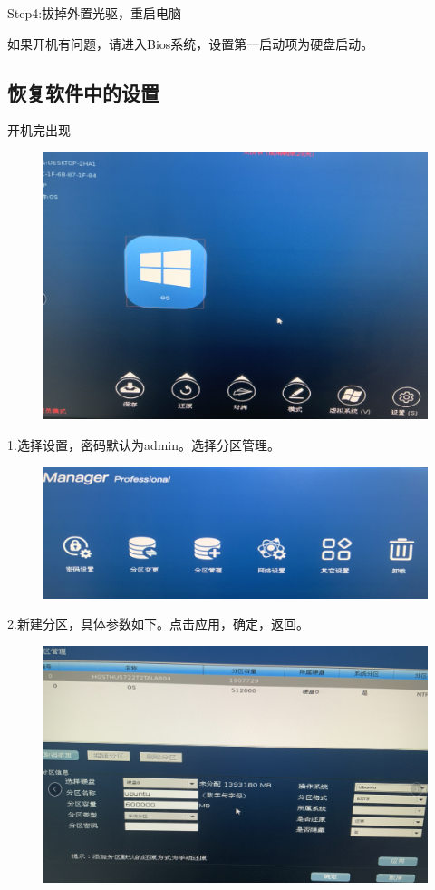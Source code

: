 \documentclass[openbib]{article}
\begin{document}
Step4:拔掉外置光驱，重启电脑

如果开机有问题，请进入Bios系统，设置第一启动项为硬盘启动。
\subsection{恢复软件中的设置}
开机完出现
\begin{figure}[htbp]
	\centering
	\includegraphics[scale=0.3]{25}
\end{figure}

1.选择设置，密码默认为admin。选择分区管理。
\begin{figure}[H]
	\centering
	\includegraphics[scale=0.3]{26}
\end{figure}

2.新建分区，具体参数如下。点击应用，确定，返回。
\begin{figure}[H]
	\centering
	\includegraphics[scale=0.3]{27}
\end{figure}
\end{document}
